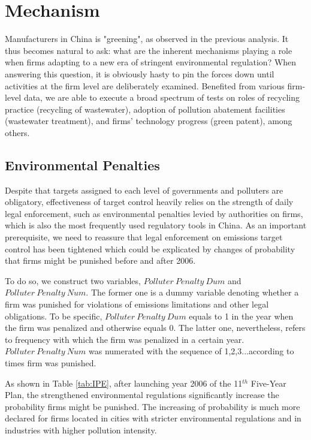 \documentclass[12pt,english]{article}
\begin{document}
 

\section{Mechanism}\label{sec:mechanism}

Manufacturers in China is "greening", as observed in the previous analysis. It thus becomes natural to ask: what are the inherent mechanisms playing a role when firms adapting to a new era of stringent environmental regulation? When answering this question, it is obviously hasty to pin the forces down until activities at the firm level are deliberately examined. Benefited from various firm-level data, we are able to execute a broad spectrum of tests on roles of recycling practice (recycling of wastewater), adoption of pollution abatement facilities (wastewater treatment), and firms' technology progress (green patent), among others.

\subsection{Environmental Penalties}\label{sec:environmental penalty}

Despite that targets assigned to each level of governments and polluters are obligatory, effectiveness of target control heavily relies on the strength of daily legal enforcement, such as environmental penalties levied by authorities on firms, which is also the most frequently used regulatory tools in China. As an important prerequisite, we need to reassure that legal enforcement on emissions target control has been tightened which could be explicated by changes of probability that firms might be punished before and after 2006.

To do so, we construct two variables, $Polluter\ Penalty\ Dum$ and $Polluter\ Penalty\ Num$. The former one is a dummy variable denoting whether a firm was punished for violations of emissions limitations and other legal obligations. To be specific, $Polluter\ Penalty\ Dum$ equals to 1 in the year when the firm was penalized and otherwise equals 0. The latter one, nevertheless, refers to frequency with which the firm was penalized in a certain year. $Polluter\ Penalty\ Num$ was numerated with the sequence of 1,2,3...according to times firm was punished.

As shown in Table \ref{tab:IPE}, after launching year 2006 of the 11$^{th}$ Five-Year Plan, the strengthened environmental regulations significantly increase the probability firms might be punished. The increasing of probability is much more declared for firms located in cities with stricter environmental regulations and in industries with higher pollution intensity.
\end{document}

